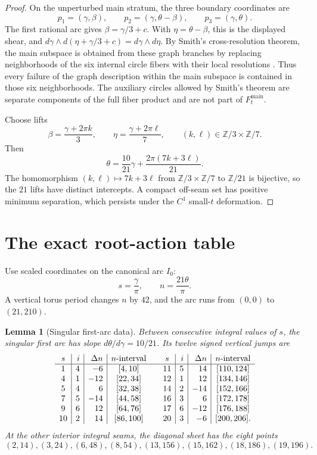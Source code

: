 \documentclass[11pt,reqno]{amsart}
\theoremstyle{plain}
\newtheorem{lemma}[theorem]{Lemma}
\theoremstyle{definition}
\newcommand{\Z}{\mathbb{Z}}
\begin{document}
\begin{proof}
On the unperturbed main stratum, the three boundary coordinates are
\[
 p_1=(\gamma,\beta),
 \qquad p_2=(\gamma,\theta-\beta),
 \qquad p_3=(\gamma,\theta).
\]
The first rational arc gives $\beta=\gamma/3+c$.  With $\eta=\theta-\beta$, this is the displayed
shear, and
$d\gamma\wedge d(\eta+\gamma/3+c)=d\gamma\wedge d\eta$.
By Smith's cross-resolution theorem, the main subspace is obtained from these graph branches by
replacing neighborhoods of the six internal circle fibers with their local resolutions
\cite[Thm.~4.22]{Smith}.  Thus every failure of the graph description within the main subspace is
contained in those six neighborhoods.  The auxiliary circles allowed by Smith's theorem are
separate components of the full fiber product and are not part of
$F_t^{\mathrm{main}}$.

Choose lifts
\[
 \beta=\frac{\gamma+2\pi k}{3},
 \qquad
 \eta=\frac{\gamma+2\pi\ell}{7},
 \qquad (k,\ell)\in\Z/3\times\Z/7.
\]
Then
\[
 \theta=\frac{10}{21}\gamma+
 \frac{2\pi(7k+3\ell)}{21}.
\]
The homomorphism $(k,\ell)\mapsto7k+3\ell$ from
$\Z/3\times\Z/7$ to $\Z/21$ is bijective, so the $21$ lifts have distinct intercepts.  A compact
off-seam set has positive minimum separation, which persists under the $C^1$ small-$t$
deformation.
\end{proof}

\section{The exact root-action table}\label{sec:actions}

Use scaled coordinates on the canonical arc $I_0$:
\[
 s=\frac{\gamma}{\pi},
 \qquad
 n=\frac{21\theta}{\pi}.
\]
A vertical torus period changes $n$ by $42$, and the arc runs from $(0,0)$ to $(21,210)$.

\begin{lemma}[Singular first-arc data]\label{lem:path-word}
Between consecutive integral values of $s$, the singular first arc has slope
$d\theta/d\gamma=10/21$.  Its twelve signed vertical jumps are
\[
\begin{array}{c|r|r|c@{\qquad}c|r|r|c}
s&i&\Delta n&n\text{-interval}&s&i&\Delta n&n\text{-interval}\\ \hline
1&4&-6 &[4,10]   &11&5& 14 &[110,124]\\
4&1&-12&[22,34]  &12&1& 12 &[134,146]\\
5&4& 6 &[32,38]  &14&2&-14 &[152,166]\\
7&5&-14&[44,58]  &16&3& 6  &[172,178]\\
9&6& 12&[64,76]  &17&6&-12 &[176,188]\\
10&2&14&[86,100] &20&3&-6  &[200,206].
\end{array}
\]
At the other interior integral seams, the diagonal sheet has the eight points
\[
 (2,14),(3,24),(6,48),(8,54),
 (13,156),(15,162),(18,186),(19,196).
\]
\end{lemma}
\end{document}
